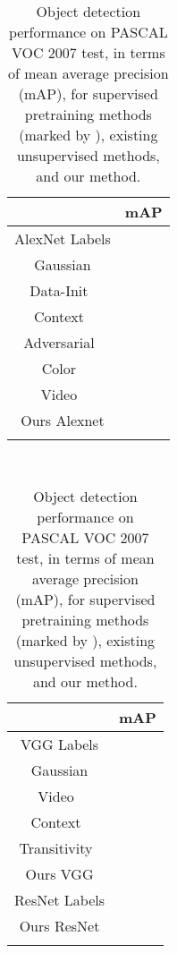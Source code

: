 \begin{table}[t]
\setlength{\tabcolsep}{1.8pt}
~~~~~~~
\begin{minipage}{0.3\linewidth}
\begin{tabular}[c]{c|c}
\Xhline{2\arrayrulewidth}
\multicolumn{1}{c|}{Method}                                          & mAP    \\ \hline
\multicolumn{1}{c|}{AlexNet Labels}                         &  \\
\multicolumn{1}{c|}{Gaussian}                                        &  \\
\multicolumn{1}{c|}{Data-Init~\cite{krahenbuhl2015data}}     &  \\
\multicolumn{1}{c|}{Context~\cite{doersch2015unsupervised}}   &  \\
\multicolumn{1}{c|}{Adversarial~\cite{donahue2016adversarial}}    &  \\
\multicolumn{1}{c|}{Color~\cite{zhang2016colorful}}           &  \\
\multicolumn{1}{c|}{Video~\cite{wang2015unsupervised}}         &  \\
\multicolumn{1}{c|}{Ours Alexnet}                             &    \\
\Xhline{2\arrayrulewidth}
\end{tabular}
\end{minipage}
~~~~~~~~~
\begin{minipage}{0.3\linewidth}
\begin{tabular}[c]{c|c}
\Xhline{2\arrayrulewidth}
\multicolumn{1}{c|}{Method}                                          & mAP    \\ \hline
\multicolumn{1}{c|}{VGG Labels}                         &  \\
\multicolumn{1}{c|}{Gaussian}                                        &  \\
\multicolumn{1}{c|}{Video~\cite{wang2015unsupervised}}     &  \\
\multicolumn{1}{c|}{Context~\cite{doersch2015unsupervised}}   &  \\
\multicolumn{1}{c|}{Transitivity~\cite{wang2017transitive}}   &  \\
\multicolumn{1}{c|}{Ours VGG}                                      &  \\
\hline
\hline
\multicolumn{1}{c|}{ResNet Labels} &  \\
\multicolumn{1}{c|}{Ours ResNet}                                            &  \\
\Xhline{2\arrayrulewidth}
\end{tabular}
\end{minipage}
\caption{Object detection performance on PASCAL VOC 2007 test,
	 in terms of mean average precision (mAP), for 
	supervised pretraining methods (marked by ),
 existing unsupervised methods, and our method.
}\label{exp:det}
\vspace{-9pt}
\end{table}
